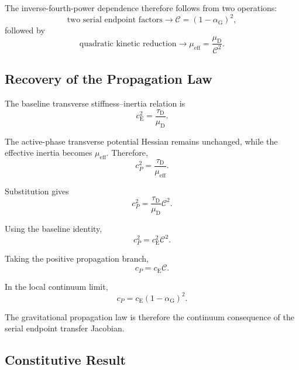 The inverse-fourth-power dependence therefore follows from two operations:
\begin{equation}
    \text{two serial endpoint factors} \longrightarrow \mathcal{C} = \left( 1-\alpha_{\mathrm{G}} \right)^2,
\end{equation}
followed by
\begin{equation}
    \text{quadratic kinetic reduction} \longrightarrow \mu_{\mathrm{eff}} = \frac{\mu_{\mathrm{D}}}{\mathcal{C}^2}.
\end{equation}

\subsection{Recovery of the Propagation Law}

The baseline transverse stiffness--inertia relation is
\begin{equation}
    c_{\mathrm{E}}^2 = \frac{\tau_{\mathrm{D}}}{\mu_{\mathrm{D}}}.
\end{equation}

The active-phase transverse potential Hessian remains unchanged, while the effective inertia becomes $\mu_{\mathrm{eff}}$. Therefore,
\begin{equation}
    c_P^2 = \frac{\tau_{\mathrm{D}}}{\mu_{\mathrm{eff}}}.
\end{equation}

Substitution gives
\begin{equation}
    c_P^2 = \frac{\tau_{\mathrm{D}}}{\mu_{\mathrm{D}}} \mathcal{C}^2.
\end{equation}

Using the baseline identity,
\begin{equation}
    c_P^2 = c_{\mathrm{E}}^2\mathcal{C}^2.
\end{equation}

Taking the positive propagation branch,
\begin{equation}
    c_P = c_{\mathrm{E}}\mathcal{C}.
\end{equation}

In the local continuum limit,
\begin{equation}
    \boxed{ c_P = c_{\mathrm{E}} \left( 1-\alpha_{\mathrm{G}} \right)^2 }.
\end{equation}

The gravitational propagation law is therefore the continuum consequence of the serial endpoint transfer Jacobian.

\subsection{Constitutive Result}

